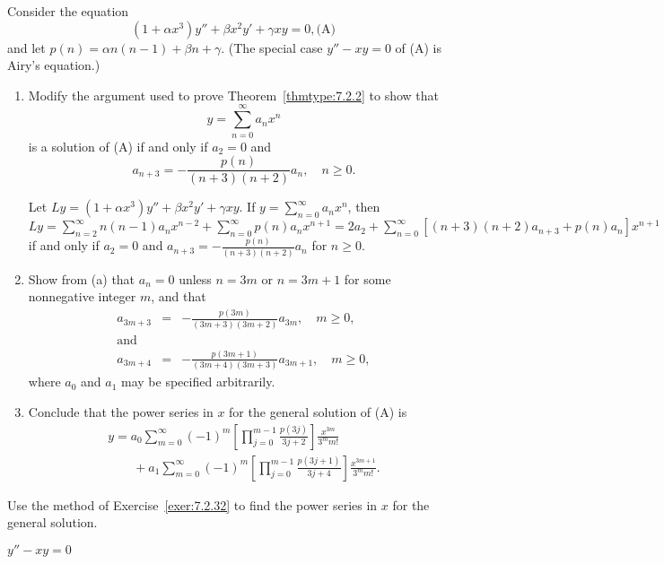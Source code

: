 \documentclass{ximera}
\begin{document}
\begin{problem}\label{exer:7.2.32}
Consider the equation
$$
\left(1+\alpha x^3\right)y''+\beta x^2y'+\gamma xy=0,
\text{(A)}
$$
and let
$p(n)=\alpha n(n-1)+\beta n+\gamma$.
(The special case $y''-xy=0$ of (A) is
 Airy's equation.)

\begin{enumerate}
\item %
 Modify the argument used to prove Theorem~\ref{thmtype:7.2.2}
to show that
$$
y=\sum_{n=0}^\infty a_nx^n
$$
  is a solution of
(A) if and only if  $a_2=0$  and
$$
a_{n+3}=-\frac{p(n)}{(n+3)(n+2)}a_n,\quad n\geq 0.
$$

\begin{solution}
    Let $Ly=(1+\alpha x^3)y''+\beta x^2y'+\gamma xy$. If
$y=\sum_{n=0}^\infty a_nx^n$, then
$Ly=\sum_{n=2}^\infty n(n-1)a_nx^{n-2}+\sum_{n=0}^\infty
p(n)a_nx^{n+1}=
2a_2+\sum_{n=0}^\infty [(n+3)(n+2)a_{n+3}+p(n)a_n]x^{n+1}
= 0$ if and only if $a_2=0$ and $a_{n+3}=-\frac{p(n)}{(n+3)(n+2)}a_n$ for $n\geq 0$.
\end{solution}

\item %
Show from (a)  that $a_n=0$  unless $n=3m$  or $n=3m+1$
for some nonnegative integer $m$, and that
\begin{eqnarray*}
a_{3m+3}&=&-\frac{p(3m)}{(3m+3)(3m+2)}a_{3m},\quad m\geq 
0,\\
\mbox{and}\\
a_{3m+4}&=&-\frac{p(3m+1)}{(3m+4)(3m+3)}
a_{3m+1},\quad m\geq 0,
\end{eqnarray*}
where $a_0$ and $a_1$ may be specified arbitrarily.
\item %
Conclude that the  power series in $x$ for the general
solution
of (A)  is
$$
\begin{array}{l}
y=a_0\sum^\infty_{m=0}(-1)^m \left[\prod^{m-1}_{j=0}
\frac{p(3j)}{3j+2}\right] \frac{x^{3m}}{3^m m!}\\
\qquad+a_1\sum^\infty_{m=0}(-1)^m
\left[\prod^{m-1}_{j=0}\frac{p(3j+1)}{3j+4}\right]
\frac{x^{3m+1}}{3^mm!}.
\end{array}
$$
\end{enumerate}
\end{problem}

\begin{problem}\label{exer:7.2.33}
Use the method of
Exercise~\ref{exer:7.2.32}  to find the power series in
$x$ for the general solution.

$y''-xy=0$
\end{problem}
\end{document}
